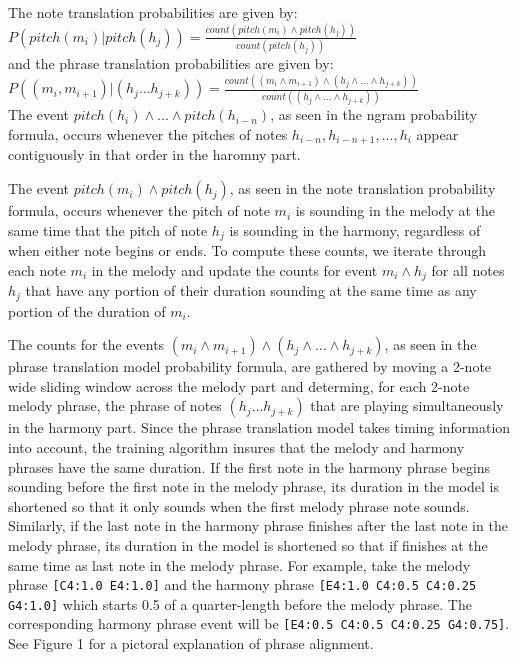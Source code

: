 \documentclass{sig-alternate}
\begin{document}
The note translation probabilities are given by:\\

$P(pitch(m_{i}) | pitch(h_{j})) = \frac{count(pitch(m_{i}) \wedge pitch(h_{j}))}{count(pitch(h_{j}))}$\\

and the phrase translation probabilities are given by:\\

$P((m_{i}, m_{i+1}) | (h_{j} \ldots h_{j+k})) = \frac{count((m_{i} \wedge m_{i+1}) \wedge (h_{j} \wedge \ldots \wedge h_{j+k}))}{count((h_{j} \wedge \ldots \wedge h_{j+k}))}$\\

The event $pitch(h_{i}) \wedge ... \wedge pitch(h_{i - n})$, as seen in the ngram probability formula, occurs whenever the pitches of notes $h_{i - n}, h_{i - n + 1}, ..., h_{i}$ appear contiguously in that order in the haromny part. 

The event $pitch(m_{i}) \wedge pitch(h_{j})$, as seen in the note translation probability formula, occurs whenever the pitch of note $m_{i}$ is sounding in the melody at the same time that the pitch of note $h_{j}$ is sounding in the harmony, regardless of when either note begins or ends. To compute these counts, we iterate through each note $m_{i}$ in the melody and update the counts for event $m_{i} \wedge h_{j}$ for all notes $h_{j}$ that have any portion of their duration sounding at the same time as any portion of the duration of $m_{i}$.

The counts for the events $(m_{i} \wedge m_{i+1}) \wedge (h_{j} \wedge \ldots \wedge h_{j+k})$, as seen in the phrase translation model probability formula, are gathered by moving a 2-note wide sliding window across the melody part
and determing, for each 2-note melody phrase, the phrase of notes $(h_{j} \ldots h_{j + k})$ that are playing simultaneously in the harmony part. Since the phrase translation model takes timing information into account, the training algorithm insures that the melody and harmony phrases have the same duration. If the first note in the harmony phrase begins sounding before the first note in the melody phrase, its duration in the model is shortened so that it only sounds when the first melody phrase note sounds. Similarly, if the last note in the harmony phrase finishes after the last note in the melody phrase, its duration in the model is shortened so that if finishes at the same time as last note in the melody phrase. For example, take the melody phrase \texttt{[C4:1.0 E4:1.0]} and the harmony phrase \texttt{[E4:1.0 C4:0.5 C4:0.25 G4:1.0]} which starts 0.5 of a quarter-length before the melody phrase. The corresponding harmony phrase event will be \texttt{[E4:0.5 C4:0.5 C4:0.25 G4:0.75]}. See Figure 1 for a pictoral explanation of phrase alignment.
\end{document}
